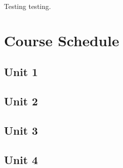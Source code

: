 \documentclass[]{article}
\begin{document}
Testing testing. 

\hypertarget{course-schedule}{%
\section{Course Schedule}\label{course-schedule}}

\hypertarget{unit-1}{%
\subsection{Unit 1}\label{unit-1}}

\hypertarget{unit-2}{%
\subsection{Unit 2}\label{unit-2}}

\hypertarget{unit-3}{%
\subsection{Unit 3}\label{unit-3}}

\hypertarget{unit-4}{%
\subsection{Unit 4}\label{unit-4}}



\printindex
\end{document}
